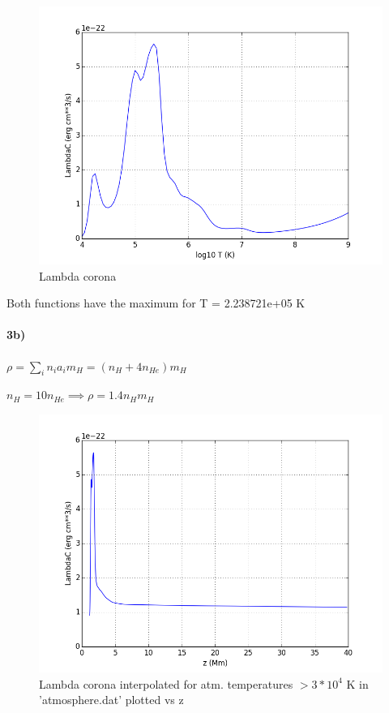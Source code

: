 \documentclass[10pt]{book}
\begin{document}
\begin{figure}[H]
 \centering
 \includegraphics[scale=0.5]{lambdaC.png}
 \caption{ Lambda corona}
\end{figure}

Both functions have the maximum for T = 2.238721e+05 K

\paragraph{3b)}

$\rho = \sum_i n_i a_i m_H = (n_H + 4 n_{He}) m_H $

$n_H = 10 n_{He} \implies \rho = 1.4 n_H m_H$

\begin{figure}[H]
 \centering
 \includegraphics[scale=0.5]{interpLambdaC.png}
 \caption{ Lambda corona interpolated for atm. temperatures $> 3 * 10^4$ K in 'atmosphere.dat' plotted vs z}
\end{figure}
\end{document}
